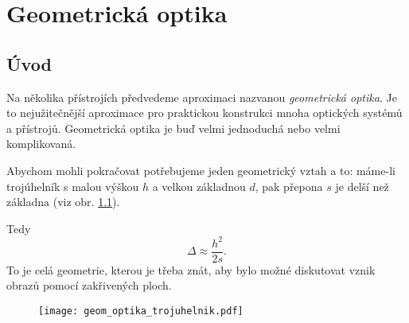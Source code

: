 \chapter{Geometrická optika}
\minitoc
\newpage
 \section{Úvod}
    Na několika přístrojích předvedeme aproximaci nazvanou \emph{geometrická optika}. Je to
    nejužitečnější aproximace pro praktickou konstrukci mnoha optických systémů a přístrojů.
    Geometrická optika je buď velmi jednoduchá nebo velmi komplikovaná.
    
    Abychom mohli pokračovat potřebujeme jeden geometrický vztah a to: máme-li trojúhelník s malou
    výškou $h$ a velkou základnou $d$, pak přepona $s$ je delší než základna (viz obr.
    \ref{FYZ:fig_trojuhelnik_optika}).  
    
    Tedy 
    \begin{equation}\label{FYZ:eq_triangle}
     \Delta \approx \frac{h^2}{2s}.
    \end{equation}
    To je celá geometrie, kterou je třeba znát, aby bylo možné diskutovat vznik obrazů pomocí
    zakřivených ploch.		         
    
    \begin{figure}
      \centering
      \texttt{[image: geom\_optika\_trojuhelnik.pdf]}
      \label{FYZ:fig_trojuhelnik_optika}  
    \end{figure}

\printbibliography[heading=subbibliography]